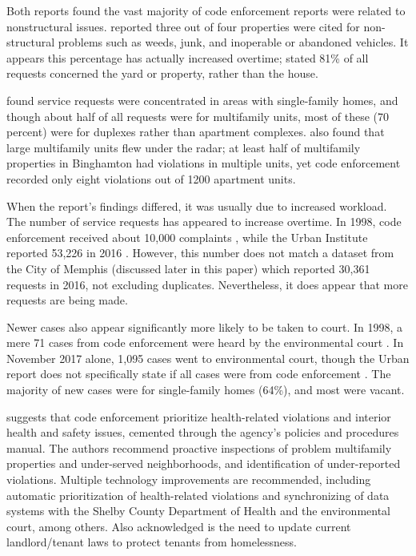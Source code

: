 \documentclass[
]{book}
\begin{document}
Both reports found the vast majority of code enforcement reports were related to nonstructural issues. \citet{betts2001} reported three out of four properties were cited for non-structural problems such as weeds, junk, and inoperable or abandoned vehicles. It appears this percentage has actually increased overtime; \citet{stacy2018} stated 81\% of all requests concerned the yard or property, rather than the house.

\citet{stacy2018} found service requests were concentrated in areas with single-family homes, and though about half of all requests were for multifamily units, most of these (70 percent) were for duplexes rather than apartment complexes. \citet{betts2001} also found that large multifamily units flew under the radar; at least half of multifamily properties in Binghamton had violations in multiple units, yet code enforcement recorded only eight violations out of 1200 apartment units.

When the report's findings differed, it was usually due to increased workload. The number of service requests has appeared to increase overtime. In 1998, code enforcement received about 10,000 complaints \citep[ 93]{betts2001}, while the Urban Institute reported 53,226 in 2016 \citep[ 51]{stacy2018}. However, this number does not match a dataset from the City of Memphis (discussed later in this paper) which reported 30,361 requests in 2016, not excluding duplicates. Nevertheless, it does appear that more requests are being made.

Newer cases also appear significantly more likely to be taken to court. In 1998, a mere 71 cases from code enforcement were heard by the environmental court \citep[ 49]{betts2001}. In November 2017 alone, 1,095 cases went to environmental court, though the Urban report does not specifically state if all cases were from code enforcement \citep[ 51]{stacy2018}. The majority of new cases were for single-family homes (64\%), and most were vacant.

\citet{stacy2018} suggests that code enforcement prioritize health-related violations and interior health and safety issues, cemented through the agency's policies and procedures manual. The authors recommend proactive inspections of problem multifamily properties and under-served neighborhoods, and identification of under-reported violations. Multiple technology improvements are recommended, including automatic prioritization of health-related violations and synchronizing of data systems with the Shelby County Department of Health and the environmental court, among others. Also acknowledged is the need to update current landlord/tenant laws to protect tenants from homelessness.
\end{document}
